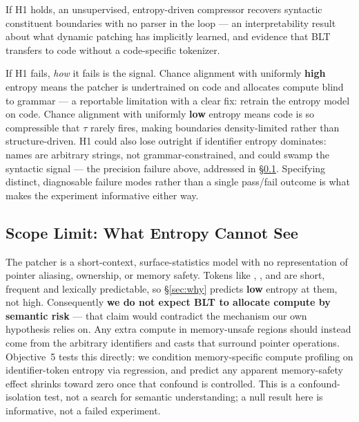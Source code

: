 If H1 holds, an unsupervised, entropy-driven compressor recovers syntactic constituent
boundaries with no parser in the loop --- an interpretability result about what dynamic
patching has implicitly learned, and evidence that BLT transfers to code without a
code-specific tokenizer.

If H1 fails, \emph{how} it fails is the signal. Chance alignment with uniformly
\textbf{high} entropy means the patcher is undertrained on code and allocates compute blind
to grammar --- a reportable limitation with a clear fix: retrain the entropy model on code.
Chance alignment with uniformly \textbf{low} entropy means code is so compressible that
$\tau$ rarely fires, making boundaries density-limited rather than structure-driven. H1
could also lose outright if identifier entropy dominates: names are arbitrary strings, not
grammar-constrained, and could swamp the syntactic signal --- the precision failure above,
addressed in \S\ref{sec:scope}. Specifying distinct, diagnosable failure modes rather than
a single pass/fail outcome is what makes the experiment informative either way.

\subsection{Scope Limit: What Entropy Cannot See}
\label{sec:scope}

The patcher is a short-context, surface-statistics model with no representation of pointer
aliasing, ownership, or memory safety. Tokens like , , \code{*} and
\code{\&} are short, frequent and lexically predictable, so \S\ref{sec:why} predicts
\textbf{low} entropy at them, not high. Consequently \textbf{we do not expect BLT to
allocate compute by semantic risk} --- that claim would contradict the mechanism our own
hypothesis relies on. Any extra compute in memory-unsafe regions should instead come from
the arbitrary identifiers and casts that surround pointer operations. Objective~5 tests this
directly: we condition memory-specific compute profiling on identifier-token entropy via
regression, and predict any apparent memory-safety effect shrinks toward zero once that
confound is controlled. This is a confound-isolation test, not a search for semantic
understanding; a null result here is informative, not a failed experiment.

